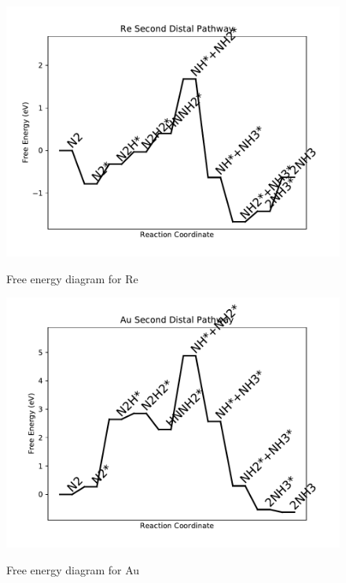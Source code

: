 \documentclass{article}
\begin{document}
\begin{figure}
\includegraphics[width=1\linewidth]{data/plots/Re_distal_2.pdf}
\label{fig:Re_distal_2}
\caption{Free energy diagram for Re}
\end{figure}

\clearpage
\begin{figure}
\includegraphics[width=1\linewidth]{data/plots/Au_distal_2.pdf}
\label{fig:Au_distal_2}
\caption{Free energy diagram for Au}
\end{figure}
\end{document}
